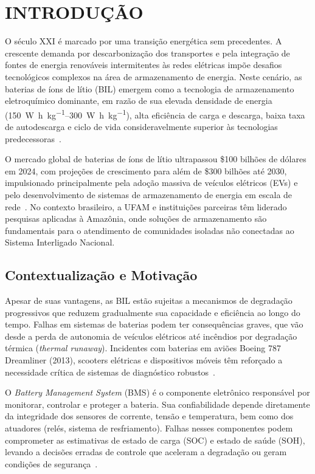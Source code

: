 \documentclass[
    12pt,
    openright,
    twoside,
    a4paper,
    brazil,
    english
]{abntex2}
\begin{document}
\chapter{INTRODUÇÃO}
\label{cap:introducao}

O século XXI é marcado por uma transição energética sem precedentes. A crescente
demanda por descarbonização dos transportes e pela integração de fontes de energia
renováveis intermitentes às redes elétricas impõe desafios tecnológicos complexos
na área de armazenamento de energia. Neste cenário, as baterias de íons de lítio
(BIL) emergem como a tecnologia de armazenamento eletroquímico dominante, em
razão de sua elevada densidade de energia (\SIrange{150}{300}{\watt\hour\per\kg}),
alta eficiência de carga e descarga, baixa taxa de autodescarga e ciclo de vida
consideravelmente superior às tecnologias predecessoras~\cite{nmc_review_2020}.

O mercado global de baterias de íons de lítio ultrapassou \$100 bilhões de dólares
em 2024, com projeções de crescimento para além de \$300 bilhões até 2030,
impulsionado principalmente pela adoção massiva de veículos elétricos (EVs) e
pelo desenvolvimento de sistemas de armazenamento de energia em escala de
rede~\cite{battery_market_2024}. No contexto brasileiro, a UFAM e instituições
parceiras têm liderado pesquisas aplicadas à Amazônia, onde soluções de
armazenamento são fundamentais para o atendimento de comunidades isoladas não
conectadas ao Sistema Interligado Nacional.

\section{Contextualização e Motivação}

Apesar de suas vantagens, as BIL estão sujeitas a mecanismos de degradação
progressivos que reduzem gradualmente sua capacidade e eficiência ao longo do
tempo. Falhas em sistemas de baterias podem ter consequências graves, que vão
desde a perda de autonomia de veículos elétricos até incêndios por degradação
térmica (\textit{thermal runaway}). Incidentes com baterias em aviões Boeing 787
Dreamliner (2013), scooters elétricas e dispositivos móveis têm reforçado a
necessidade crítica de sistemas de diagnóstico robustos~\cite{battery_safety_2022}.

O \textit{Battery Management System} (BMS) é o componente eletrônico responsável
por monitorar, controlar e proteger a bateria. Sua confiabilidade depende
diretamente da integridade dos sensores de corrente, tensão e temperatura, bem
como dos atuadores (relés, sistema de resfriamento). Falhas nesses componentes
podem comprometer as estimativas de estado de carga (SOC) e estado de saúde (SOH),
levando a decisões erradas de controle que aceleram a degradação ou geram
condições de segurança~\cite{bms_diagnostics_2023}.
\end{document}

